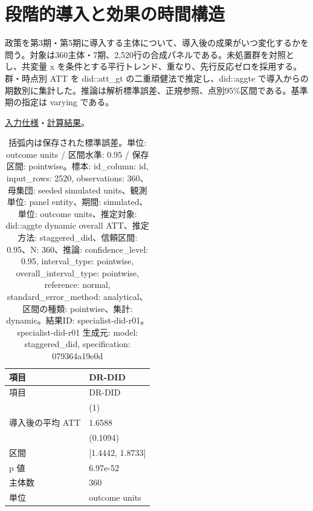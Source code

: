 \documentclass[ecta,nameyear,draft]{econsocart}
\begin{document}
\begin{minipage}{\linewidth}

\section{段階的導入と効果の時間構造}\label{result-1}

政策を第3期・第5期に導入する主体について、導入後の成果がいつ変化するかを問う。対象は360主体・7期、2,520行の合成パネルである。未処置群を対照とし、共変量
x を条件とする平行トレンド、重なり、先行反応ゼロを採用する。群・時点別
ATT を did::att\_gt の二重頑健法で推定し、did::aggte
で導入からの期数別に集計した。推論は解析標準誤差、正規参照、点別95\%区間である。基準期の指定は
varying である。

\href{https://github.com/yoshimurahiroki/econ-project-mini/blob/f9093ba87cabce7bee1fdf3391656544617a8cb9/examples/research-workspace/models/did-spec.json}{入力仕様}・\href{https://github.com/yoshimurahiroki/econ-project-mini/blob/f9093ba87cabce7bee1fdf3391656544617a8cb9/examples/research-workspace/models/did-result.json}{計算結果}。

\begin{longtable}[]{@{}ll@{}}
\caption{括弧内は保存された標準誤差。単位: outcome units / 区間水準:
0.95 / 保存区間: pointwise。標本: id\_column: id, input\_rows: 2520,
observations: 360、母集団: seeded simulated units、観測単位: panel
entity、期間: simulated、単位: outcome units、推定対象: did::aggte
dynamic overall ATT、推定方法: staggered\_did、信頼区間: 0.95、N:
360、推論: confidence\_level: 0.95, interval\_type: pointwise,
overall\_interval\_type: pointwise, reference: normal,
standard\_error\_method: analytical、区間の種類: pointwise、集計:
dynamic。結果ID: specialist-did-r01。specialist-did-r01 生成元: model:
staggered\_did, specification: 079364a19e0d}\tabularnewline
\toprule\noalign{}
項目 & DR-DID \\
\midrule\noalign{}
\endfirsthead
\toprule\noalign{}
項目 & DR-DID \\
\midrule\noalign{}
\endhead
\bottomrule\noalign{}
\endlastfoot
& (1) \\
導入後の平均 ATT & 1.6588 \\
& (0.1094) \\
区間 & {[}1.4442, 1.8733{]} \\
p 値 & 6.97e-52 \\
主体数 & 360 \\
単位 & outcome units \\
\end{longtable}

\end{minipage}
\end{document}

